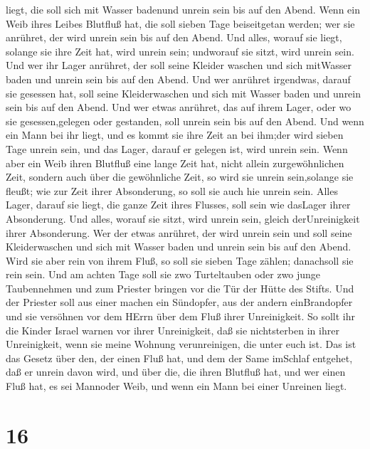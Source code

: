 liegt, die soll sich mit Wasser badenund unrein sein bis auf den Abend.
 Wenn ein Weib ihres Leibes Blutfluß hat, die soll sieben
Tage beiseitgetan werden; wer sie anrühret, der wird unrein sein bis auf
den Abend.  Und alles, worauf sie liegt, solange sie ihre
Zeit hat, wird unrein sein; undworauf sie sitzt, wird unrein sein.
 Und wer ihr Lager anrühret, der soll seine Kleider waschen
und sich mitWasser baden und unrein sein bis auf den Abend.
 Und wer anrühret irgendwas, darauf sie gesessen hat, soll
seine Kleiderwaschen und sich mit Wasser baden und unrein sein bis auf
den Abend.  Und wer etwas anrühret, das auf ihrem Lager,
oder wo sie gesessen,gelegen oder gestanden, soll unrein sein bis auf
den Abend.  Und wenn ein Mann bei ihr liegt, und es kommt
sie ihre Zeit an bei ihm;der wird sieben Tage unrein sein, und das
Lager, darauf er gelegen ist, wird unrein sein.  Wenn aber
ein Weib ihren Blutfluß eine lange Zeit hat, nicht allein
zurgewöhnlichen Zeit, sondern auch über die gewöhnliche Zeit, so wird
sie unrein sein,solange sie fleußt; wie zur Zeit ihrer Absonderung, so
soll sie auch hie unrein sein.  Alles Lager, darauf sie
liegt, die ganze Zeit ihres Flusses, soll sein wie dasLager ihrer
Absonderung. Und alles, worauf sie sitzt, wird unrein sein, gleich
derUnreinigkeit ihrer Absonderung.  Wer der etwas anrühret,
der wird unrein sein und soll seine Kleiderwaschen und sich mit Wasser
baden und unrein sein bis auf den Abend.  Wird sie aber
rein von ihrem Fluß, so soll sie sieben Tage zählen; danachsoll sie rein
sein.  Und am achten Tage soll sie zwo Turteltauben oder
zwo junge Taubennehmen und zum Priester bringen vor die Tür der Hütte
des Stifts.  Und der Priester soll aus einer machen ein
Sündopfer, aus der andern einBrandopfer und sie versöhnen vor dem HErrn
über dem Fluß ihrer Unreinigkeit.  So sollt ihr die Kinder
Israel warnen vor ihrer Unreinigkeit, daß sie nichtsterben in ihrer
Unreinigkeit, wenn sie meine Wohnung verunreinigen, die unter euch ist.
 Das ist das Gesetz über den, der einen Fluß hat, und dem
der Same imSchlaf entgehet, daß er unrein davon wird,  und
über die, die ihren Blutfluß hat, und wer einen Fluß hat, es sei
Mannoder Weib, und wenn ein Mann bei einer Unreinen liegt.

\hypertarget{section-15}{%
\section{16}\label{section-15}}

